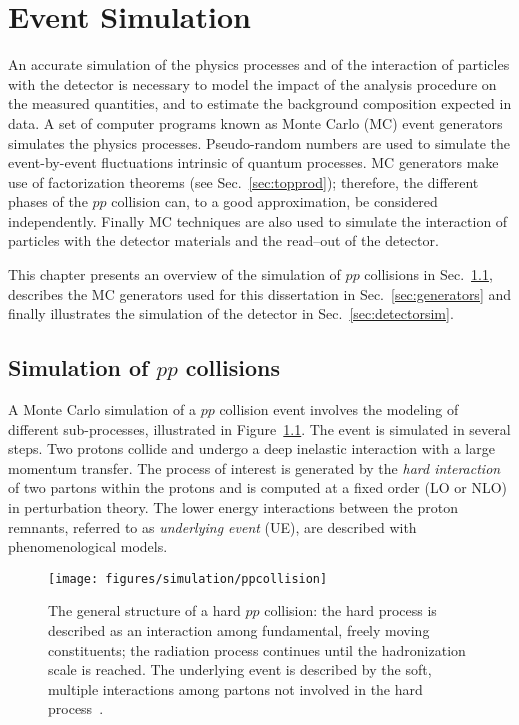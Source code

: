 \chapter{Event Simulation}
\label{sec:simulation}

An accurate simulation of the physics processes and of the interaction
of particles with the detector is necessary to model the impact of the
analysis procedure on the measured quantities, and to estimate the
background composition expected in data. A set of computer programs
known as Monte Carlo (MC) event generators simulates the physics
processes.
Pseudo-random numbers are used to simulate the event-by-event
fluctuations intrinsic of quantum processes. MC generators make use of
factorization theorems (see Sec.~\ref{sec:topprod}); therefore, the
different phases of the $pp$ collision can, to a good approximation,
be considered independently. 
Finally MC techniques are also used to simulate the interaction of
particles with the detector materials and the read--out of the
detector.

This chapter presents an overview of the simulation of $pp$
collisions in Sec.~\ref{sec:MCsimulation}, describes the MC generators
used for this dissertation in Sec.~\ref{sec:generators} and finally illustrates
the simulation of the detector in Sec.~\ref{sec:detectorsim}.

\section{Simulation of $pp$ collisions}
\label{sec:MCsimulation}

A Monte Carlo simulation of a $pp$ collision event involves the
modeling of different sub-processes, illustrated in
Figure~\ref{fig:collision}.
The event is simulated in several steps. Two protons collide and
undergo a deep inelastic interaction with a large momentum transfer.
The process of interest is generated by the {\it hard interaction} of
two partons within the protons and is computed at a fixed order (LO
or NLO) in perturbation theory. 
The lower energy interactions between the proton remnants,
referred to as {\it underlying event} (UE), are described with
phenomenological models.

\begin{figure}[ht]
  \begin{center}
    \texttt{[image: figures/simulation/ppcollision]}
    \caption[General structure of a hard $pp$ collision]{
      The general structure of a hard $pp$ collision: the hard process
      is described as an interaction among fundamental, freely moving
      constituents; the radiation process continues until the
      hadronization scale is reached. The underlying event is
      described by the soft, multiple interactions among partons not
      involved in the hard process~\cite{mangano2005}.}
    \label{fig:collision}
  \end{center}
\end{figure}

